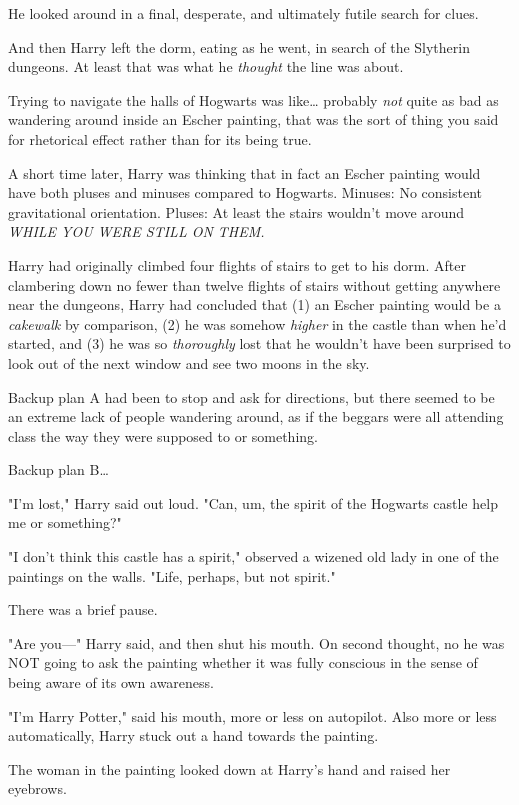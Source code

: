 He looked around in a final, desperate, and ultimately futile search for clues.

And then Harry left the dorm, eating as he went, in search of the Slytherin 
dungeons. At least that was what he \emph{thought} the line was about.

Trying to navigate the halls of Hogwarts was like{\ldots} probably \emph{not} 
quite as bad as wandering around inside an Escher painting, that was the sort 
of thing you said for rhetorical effect rather than for its being true.

A short time later, Harry was thinking that in fact an Escher painting would 
have both pluses and minuses compared to Hogwarts. Minuses: No consistent 
gravitational orientation. Pluses: At least the stairs wouldn't move 
around\emph{ WHILE YOU WERE STILL ON THEM.}

Harry had originally climbed four flights of stairs to get to his dorm. After 
clambering down no fewer than twelve flights of stairs without getting anywhere 
near the dungeons, Harry had concluded that (1) an Escher painting would be a 
\emph{cakewalk} by comparison, (2) he was somehow \emph{higher} in the castle 
than when he'd started, and (3) he was so \emph{thoroughly} lost that he 
wouldn't have been surprised to look out of the next window and see two moons 
in the sky.

Backup plan A had been to stop and ask for directions, but there seemed to be 
an extreme lack of people wandering around, as if the beggars were all 
attending class the way they were supposed to or something.

Backup plan B{\ldots}

"I'm lost," Harry said out loud. "Can, um, the spirit of the Hogwarts castle 
help me or something?"

"I don't think this castle has a spirit," observed a wizened old lady in one of 
the paintings on the walls. "Life, perhaps, but not spirit."

There was a brief pause.

"Are you---" Harry said, and then shut his mouth. On second thought, no he was 
NOT going to ask the painting whether it was fully conscious in the sense of 
being aware of its own awareness.

"I'm Harry Potter," said his mouth, more or less on autopilot. Also more or 
less automatically, Harry stuck out a hand towards the painting.

The woman in the painting looked down at Harry's hand and raised her eyebrows.

